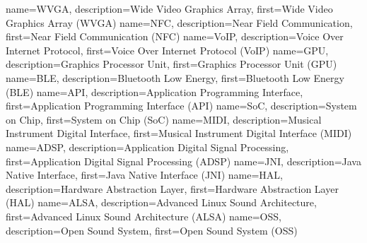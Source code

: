 {
  name={WVGA},
  description={Wide Video Graphics Array},
  first={Wide Video Graphics Array (WVGA)}
}
{
	name={NFC},
	description={Near Field Communication},
	first={Near Field Communication (NFC)}
}
{
	name={VoIP},
	description={Voice Over Internet Protocol},
	first={Voice Over Internet Protocol (VoIP)}
}
{
	name={GPU},
	description={Graphics Processor Unit},
	first={Graphics Processor Unit (GPU)}
}
{
	name={BLE},
	description={Bluetooth Low Energy},
	first={Bluetooth Low Energy (BLE)}
}
{
	name={API},
	description={Application Programming Interface},
	first={Application Programming Interface (API)}
}
{
	name={SoC},
	description={System on Chip},
	first={System on Chip (SoC)}
}
{
	name={MIDI},
	description={Musical Instrument Digital Interface},
	first={Musical Instrument Digital Interface (MIDI)}
}
{
	name={ADSP},
	description={Application Digital Signal Processing},
	first={Application Digital Signal Processing (ADSP)}
}
{
	name={JNI},
	description={Java Native Interface},
	first={Java Native Interface (JNI)}
}
{
	name={HAL},
	description={Hardware Abstraction Layer},
	first={Hardware Abstraction Layer (HAL)}
}
{
	name={ALSA},
	description={Advanced Linux Sound Architecture},
	first={Advanced Linux Sound Architecture (ALSA)}
}
{
	name={OSS},
	description={Open Sound System},
	first={Open Sound System (OSS)}
}